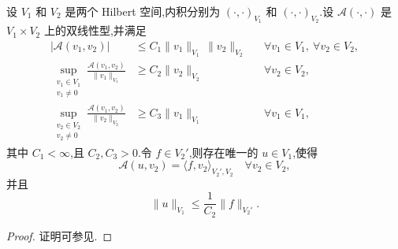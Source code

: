 \begin{theorem}\label{thm:infsup-complete-bilinear-form}
设 $V_1$ 和 $V_2$ 是两个 Hilbert 空间,内积分别为 $(\cdot,\cdot)_{V_1}$ 和 $(\cdot,\cdot)_{V_2}$.设 $\mathcal{A}(\cdot,\cdot)$ 是 $V_1\times V_2$ 上的双线性型,并满足
\begin{align*}
  |\mathcal{A}(v_1,v_2)|
    &\le C_1\|v_1\|_{V_1}\,\|v_2\|_{V_2}
      &&\forall v_1\in V_1,\ \forall v_2\in V_2,\\
  \sup_{\substack{v_1\in V_1\\v_1\ne0}}
    \frac{\mathcal{A}(v_1,v_2)}{\|v_1\|_{V_1}}
    &\ge C_2\|v_2\|_{V_2}
      &&\forall v_2\in V_2,\\
  \sup_{\substack{v_2\in V_2\\v_2\ne0}}
    \frac{\mathcal{A}(v_1,v_2)}{\|v_2\|_{V_2}}
    &\ge C_3\|v_1\|_{V_1}
      &&\forall v_1\in V_1,
\end{align*}
其中 $C_1<\infty$,且 $C_2,C_3>0$.令 $f\in V_2'$,则存在唯一的 $u\in V_1$,使得
\[
  \mathcal{A}(u,v_2)=\langle f,v_2\rangle_{V_2',V_2}
  \quad\forall v_2\in V_2,
\]
并且
\[
  \|u\|_{V_1}\le\frac{1}{C_2}\|f\|_{V_2'}.
\]
\end{theorem}
\begin{proof}
证明可参见\textcite{Babuska1971}.
\end{proof}

